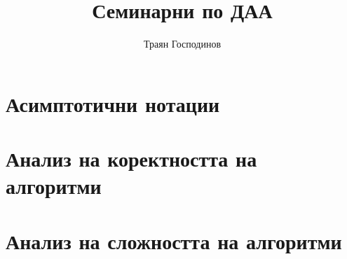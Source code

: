 \documentclass[a4paper,12pt,oneside]{book}%
\title{Семинарни по ДАА}
\author{Траян Господинов}
\begin{document}
 
	
	\maketitle
	
	\tableofcontents
	
	\chapter{Асимптотични нотации}
	
	
	\chapter{Анализ на коректността на алгоритми}
	
	
	\chapter{Анализ на сложността на алгоритми}
	

\end{document}
